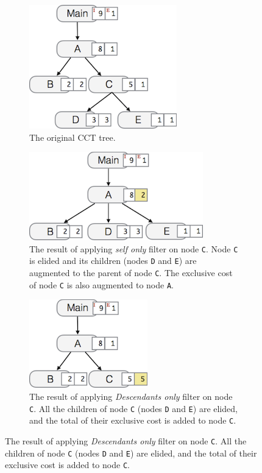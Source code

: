 \begin{figure}
  \centering
  \begin{subfigure}{.45\textwidth}
    \centering
    \includegraphics[scale=.8]{fig/hpcviewer-filter-cct.png}
    \caption{The original CCT tree.}
    \label{fig:filter-cct}
  \end{subfigure}%
  \qquad
  \begin{subfigure}{.45\textwidth}
    \centering
    \includegraphics[scale=.8]{fig/hpcviewer-filter-self.png}
    \caption{The result of applying \emph{self only} filter on node \texttt{C}. %
Node \texttt{C} is elided and its children (nodes \texttt{D} and \texttt{E}) are augmented to the parent of node \texttt{C}.
The exclusive cost of node \texttt{C} is also augmented to node \texttt{A}.}
    \label{fig:filter-self}
  \end{subfigure}
  \begin{subfigure}{.45\textwidth}
    \centering
    \includegraphics[scale=.8]{fig/hpcviewer-filter-children.png}
    \caption{The result of applying \emph{Descendants only} filter on node \texttt{C}. %
All the children of node \texttt{C} (nodes \texttt{D} and \texttt{E}) are elided, and the total of their exclusive cost is added to node \texttt{C}. }

\end{subfigure}
\end{figure}
